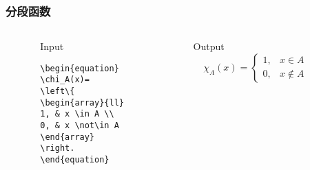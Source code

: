 \begin{frame}[fragile]\frametitle{分段函数}
  \begin{columns}
    \begin{column}{0.05\textwidth}
    \end{column}
    \begin{column}{0.45\textwidth}
    \begin{block}{Input}
    \begin{verbatim}
\begin{equation}
\chi_A(x)=
\left\{
\begin{array}{ll}
1, & x \in A \\
0, & x \not\in A
\end{array}
\right.
\end{equation}
    \end{verbatim}
    \end{block}
    \end{column}
    \begin{column}{0.025\textwidth}
    \end{column}
    \begin{column}{0.45\textwidth}
    \begin{block}{Output}
        \begin{equation}
        \chi_A(x)=
        \left\{
        \begin{array}{ll}
        1, & x \in A \\
        0, & x \not\in A
        \end{array}
        \right.
        \end{equation}
    \end{block}
    \end{column}
    \begin{column}{0.025\textwidth}
    \end{column}
  \end{columns}
\end{frame}